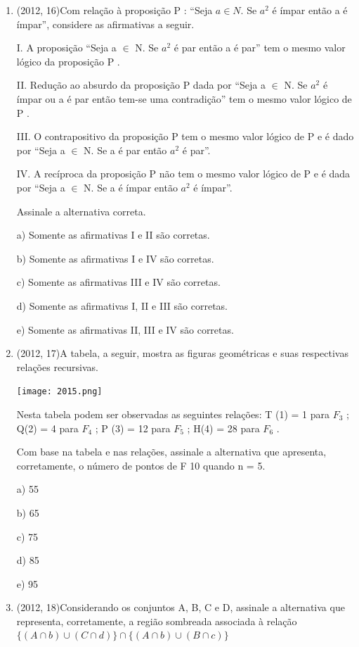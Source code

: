 \documentclass{article}
\begin{document}
\begin{enumerate}
\item(2012, 16)Com relação à proposição P : “Seja $a \in N$. Se $a^2$ é ímpar então a é ímpar”, considere as afirmativas a seguir.

I. A proposição “Seja a $\in$ N. Se $a^2$ é par então a é par” tem o mesmo valor lógico da proposição P .

II. Redução ao absurdo da proposição P dada por “Seja a $\in$ N. Se  $a^2$ é ímpar ou a é par então tem-se
uma contradição” tem o mesmo valor lógico de P .

III. O contrapositivo da proposição P tem o mesmo valor lógico de P e é dado por “Seja a $\in$ N. Se a é
par então $a^2$ é par”.

IV. A recíproca da proposição P não tem o mesmo valor lógico de P e é dada por “Seja a $\in$ N. Se a é
ímpar então $a^2$ é ímpar”.

Assinale a alternativa correta.


a) Somente as afirmativas I e II são corretas.

b) Somente as afirmativas I e IV são corretas.

c) Somente as afirmativas III e IV são corretas.

d) Somente as afirmativas I, II e III são corretas.

e) Somente as afirmativas II, III e IV são corretas.\newline


\item(2012, 17)A tabela, a seguir, mostra as figuras geométricas e suas respectivas relações recursivas.


\texttt{[image: 2015.png]}\newline


Nesta tabela podem ser observadas as seguintes relações:
T (1) = 1 para $F_3$ ; Q(2) = 4 para $F_4$ ; P (3) = 12 para $F_5$ ; H(4) = 28 para $F_6$ .

Com base na tabela e nas relações, assinale a alternativa que apresenta, corretamente, o número de
pontos de F 10 quando n = 5.

a) 55

b) 65

c) 75

d) 85

e) 95\newline





\item(2012, 18)Considerando os conjuntos A, B, C e D, assinale a alternativa que representa, corretamente, a região sombreada associada à relação $\{ (A\cap b)\cup (C\cap d) \}\cap \{ (A\cap b)\cup (B\cap c)\}$





\end{enumerate}
\end{document}
